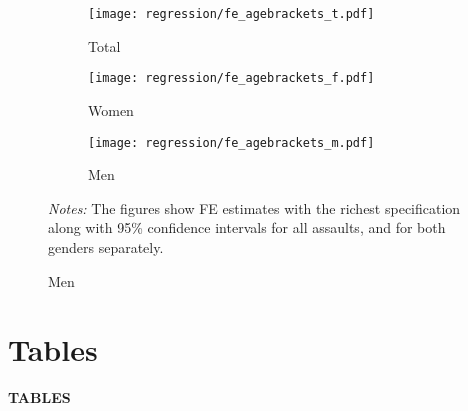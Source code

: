\documentclass[11pt, a4paper]{article} %
\begin{document}
\begin{landscape}
	\vspace*{\fill}
	\begin{figure}[H]\centering
		\caption{The age profile of the effect}\label{fig_soc_ext:fe_age_profile}
		\begin{subfigure}[h]{0.31\linewidth}\centering\caption{Total}
			\texttt{[image: regression/fe\_agebrackets\_t.pdf]}
		\end{subfigure}
		\begin{subfigure}[h]{0.31\linewidth}\centering\caption{Women}
			\texttt{[image: regression/fe\_agebrackets\_f.pdf]}
		\end{subfigure}
		\begin{subfigure}[h]{0.31\linewidth}\centering\caption{Men}
			\texttt{[image: regression/fe\_agebrackets\_m.pdf]}
		\end{subfigure}
		\scriptsize
		\begin{minipage}{\linewidth}
			\emph{Notes:} The figures show FE estimates with the richest specification along with 95\% confidence intervals for all assaults, and for both genders separately. 
		\end{minipage}
	\end{figure}
	\vspace*{\fill}\clearpage
\end{landscape}



\newpage
\TODO\section{Tables}
\vspace*{\fill}
{\Huge \begin{center}\textbf{TABLES}\end{center}}
\vspace*{\fill}\clearpage
\end{document}

